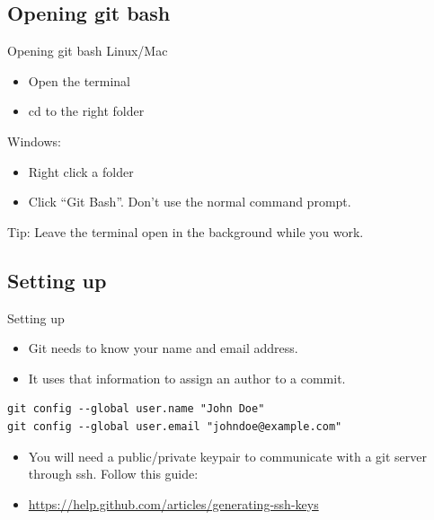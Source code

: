 \documentclass[10pt,a4paper]{beamer}
\begin{document}
\subsection{Opening git bash}
\begin{frame}{Opening git bash}
Linux/Mac
\begin{itemize}
\item Open the terminal
\item cd to the right folder
\end{itemize}

Windows:
\begin{itemize}
\item Right click a folder
\item Click ``Git Bash''. Don't use the normal command prompt.
\end{itemize}

Tip: Leave the terminal open in the background while you work.


\end{frame}

\subsection{Setting up}
\begin{frame}[fragile]{Setting up}
\begin{itemize}
\item Git needs to know your name and email address.
\item It uses that information to assign an author to a commit.
\end{itemize}

\begin{verbatim}
git config --global user.name "John Doe"
git config --global user.email "johndoe@example.com"
\end{verbatim}

\begin{itemize}
\item You will need a public/private keypair to communicate with a git server through ssh. Follow this guide:
\item \url{https://help.github.com/articles/generating-ssh-keys}
\end{itemize}
\end{frame}
\end{document}
